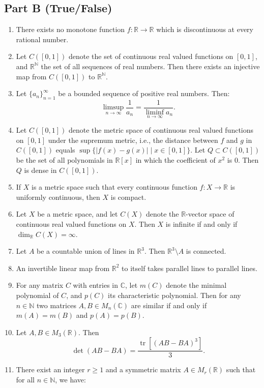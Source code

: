 \documentclass[11pt, a4paper]{article}
\begin{document}
\subsection*{Part B (True/False)}
\begin{enumerate}
  \item There exists no monotone function $f: \mathbb{R} \to \mathbb{R}$ which is discontinuous at every rational number.
  \item Let $C([0,1])$ denote the set of continuous real valued functions on $[0,1]$, and $\mathbb{R}^{\mathbb{N}}$ the set of all sequences of real numbers. Then there exists an injective map from $C([0,1])$ to $\mathbb{R}^{\mathbb{N}}$.
  \item Let $\{a_n\}_{n=1}^\infty$ be a bounded sequence of positive real numbers. Then:
  \[
    \limsup_{n \to \infty} \frac{1}{a_n} = \frac{1}{\liminf_{n \to \infty} a_n}.
  \]
  \item Let $C([0,1])$ denote the metric space of continuous real valued functions on $[0,1]$ under the supremum metric, i.e., the distance between $f$ and $g$ in $C([0,1])$ equals $\sup\{|f(x) - g(x)| \mid x \in [0,1]\}$. Let $Q \subset C([0,1])$ be the set of all polynomials in $\mathbb{R}[x]$ in which the coefficient of $x^2$ is $0$. Then $Q$ is dense in $C([0,1])$.
  \item If $X$ is a metric space such that every continuous function $f: X \to \mathbb{R}$ is uniformly continuous, then $X$ is compact.
  \item Let $X$ be a metric space, and let $C(X)$ denote the $\mathbb{R}$-vector space of continuous real valued functions on $X$. Then $X$ is infinite if and only if $\dim_{\mathbb{R}} C(X) = \infty$.
  \item Let $A$ be a countable union of lines in $\mathbb{R}^3$. Then $\mathbb{R}^3 \setminus A$ is connected.
  \item An invertible linear map from $\mathbb{R}^2$ to itself takes parallel lines to parallel lines.
  \item For any matrix $C$ with entries in $\mathbb{C}$, let $m(C)$ denote the minimal polynomial of $C$, and $p(C)$ its characteristic polynomial. Then for any $n \in \mathbb{N}$ two matrices $A, B \in M_n(\mathbb{C})$ are similar if and only if $m(A) = m(B)$ and $p(A) = p(B)$.
  \item Let $A, B \in M_3(\mathbb{R})$. Then
  \[
    \det(AB - BA) = \frac{\operatorname{tr}[(AB - BA)^3]}{3}.
  \]
  \item There exist an integer $r \ge 1$ and a symmetric matrix $A \in M_r(\mathbb{R})$ such that for all $n \in \mathbb{N}$, we have:

\end{enumerate}
\end{document}
